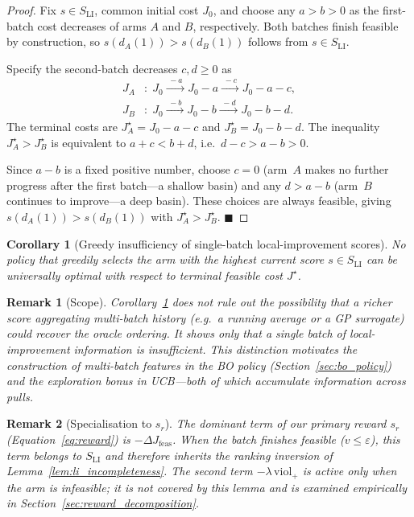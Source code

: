\documentclass[lettersize,journal]{IEEEtran}
\newtheorem{corollary}{Corollary}
\newtheorem{remark}{Remark}
\begin{document}
\begin{proof}
Fix $s \in S_{\mathrm{LI}}$, common initial cost $J_0$, and choose any $a > b > 0$ as the first-batch cost decreases of arms $A$ and $B$, respectively. Both batches finish feasible by construction, so $s(d_A(1)) > s(d_B(1))$ follows from $s \in S_{\mathrm{LI}}$.

Specify the second-batch decreases $c, d \ge 0$ as
\[
\begin{aligned}
J_A &: \; J_0 \xrightarrow{\;-a\;} J_0 - a \xrightarrow{\;-c\;} J_0 - a - c,\\
J_B &: \; J_0 \xrightarrow{\;-b\;} J_0 - b \xrightarrow{\;-d\;} J_0 - b - d.
\end{aligned}
\]
The terminal costs are $J_A^\star = J_0 - a - c$ and $J_B^\star = J_0 - b - d$.  The inequality $J_A^\star > J_B^\star$ is equivalent to $a + c < b + d$, i.e.\ $d - c > a - b > 0$.

Since $a - b$ is a fixed positive number, choose $c = 0$ (arm~$A$ makes no further progress after the first batch---a shallow basin) and any $d > a - b$ (arm~$B$ continues to improve---a deep basin).  These choices are always feasible, giving $s(d_A(1)) > s(d_B(1))$ with $J_A^\star > J_B^\star$. \hfill $\blacksquare$
\end{proof}

\begin{corollary}[Greedy insufficiency of single-batch local-improvement scores]
\label{cor:greedy_insufficiency}
No policy that greedily selects the arm with the highest current score $s \in S_{\mathrm{LI}}$ can be universally optimal with respect to terminal feasible cost $J^\star$.
\end{corollary}

\begin{remark}[Scope]
Corollary~\ref{cor:greedy_insufficiency} does not rule out the possibility that a richer score aggregating multi-batch history (e.g.\ a running average or a GP surrogate) could recover the oracle ordering.  It shows only that a single batch of local-improvement information is insufficient.  This distinction motivates the construction of multi-batch features in the BO policy (Section~\ref{sec:bo_policy}) and the exploration bonus in UCB---both of which accumulate information across pulls.
\end{remark}

\begin{remark}[Specialisation to $s_r$]
The dominant term of our primary reward $s_r$ (Equation~\eqref{eq:reward}) is $-\Delta J_{\mathrm{feas}}$.  When the batch finishes feasible ($v \le \varepsilon$), this term belongs to $S_{\mathrm{LI}}$ and therefore inherits the ranking inversion of Lemma~\ref{lem:li_incompleteness}.  The second term $-\lambda\,\mathrm{viol}_+$ is active only when the arm is infeasible; it is not covered by this lemma and is examined empirically in Section~\ref{sec:reward_decomposition}.
\end{remark}
\end{document}
